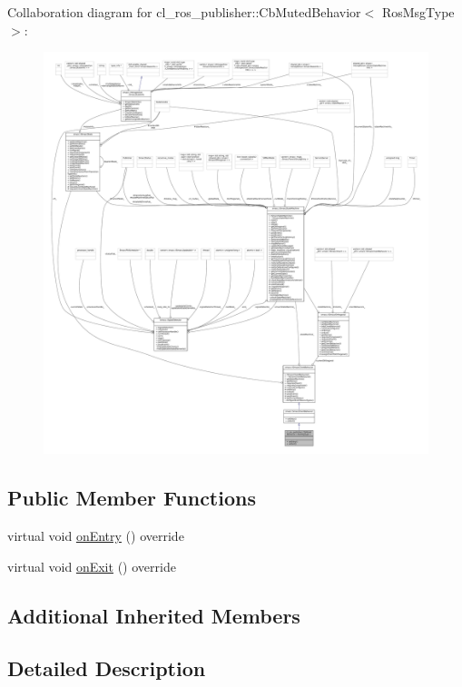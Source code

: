 Collaboration diagram for cl\+\_\+ros\+\_\+publisher\+:\+:Cb\+Muted\+Behavior$<$ Ros\+Msg\+Type $>$\+:
\nopagebreak
\begin{figure}[H]
\begin{center}
\leavevmode
\includegraphics[width=350pt]{classcl__ros__publisher_1_1CbMutedBehavior__coll__graph}
\end{center}
\end{figure}
\subsection*{Public Member Functions}
\begin{DoxyCompactItemize}
\item 
virtual void \hyperlink{classcl__ros__publisher_1_1CbMutedBehavior_a79376d9160e3bd44678a2c0d89f1b4de}{on\+Entry} () override
\item 
virtual void \hyperlink{classcl__ros__publisher_1_1CbMutedBehavior_a4c02187c58358fa811777d9956510222}{on\+Exit} () override
\end{DoxyCompactItemize}
\subsection*{Additional Inherited Members}


\subsection{Detailed Description}
